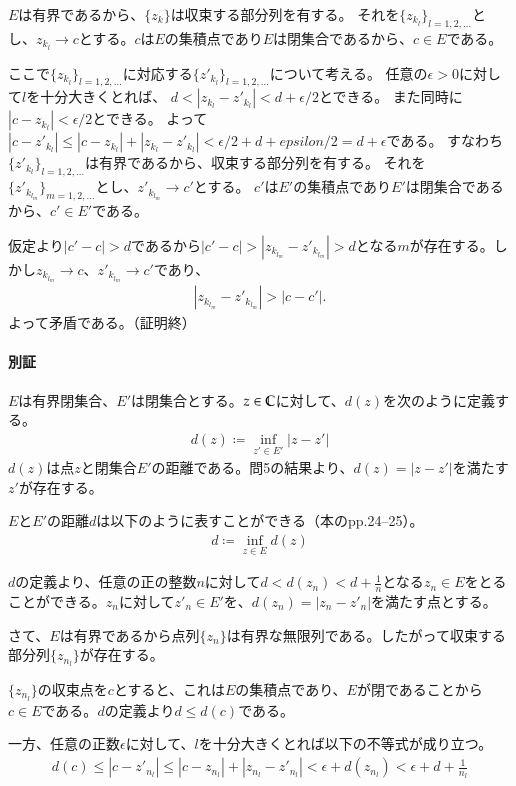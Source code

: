 $E$は有界であるから、$\{z_k\}$は収束する部分列を有する。
それを$\{z_{k_l}\}_{l=1,2,\dots}$とし、$z_{k_l}\longrightarrow c$とする。$c$は$E$の集積点であり$E$は閉集合であるから、$c\in E$である。

ここで$\{z_{k_l}\}_{l=1,2,\dots}$に対応する$\{z'_{k_l}\}_{l=1,2,\dots}$について考える。
任意の$\epsilon>0$に対して$l$を十分大きくとれば、
$d<|z_{k_l}-z'_{k_l}|<d+\epsilon/2$とできる。
また同時に$|c-z_{k_l}|<\epsilon/2$とできる。
よって$|c-z'_{k_l}|\le|c-z_{k_l}|+|z_{k_l}-z'_{k_l}|<\epsilon/2+d+epsilon/2=d+\epsilon$である。
すなわち$\{z'_{k_l}\}_{l=1,2,\dots}$は有界であるから、収束する部分列を有する。
それを$\{z'_{k_{l_m}}\}_{m=1,2,\dots}$とし、$z'_{k_{l_m}}\rightarrow c'$とする。
$c'$は$E'$の集積点であり$E'$は閉集合であるから、$c'\in E'$である。

仮定より$|c'-c|>d$であるから$|c'-c|>|z_{k_{l_m}}-z'_{k_{l_m}}|>d$となる$m$が存在する。しかし$z_{k_{l_m}}\longrightarrow c$、$z'_{k_{l_m}}\longrightarrow c'$であり、
\begin{align*}
    |z_{k_{l_m}}-z'_{k_{l_m}}|>|c-c'|.
\end{align*}
よって矛盾である。（証明終）

\paragraph{別証}
$E$は有界閉集合、$E'$は閉集合とする。$z\in \mathbb{C}$に対して、$d(z)$を次のように定義する。
\begin{align*}
    d(z)\coloneqq \inf_{z'\in E'}|z-z'|
\end{align*}
$d(z)$は点$z$と閉集合$E'$の距離である。問5の結果より、$d(z)=|z-z'|$を満たす$z'$が存在する。

$E$と$E'$の距離$d$は以下のように表すことができる（本のpp.24--25）。
\begin{align*}
    d\coloneqq \inf_{z\in E}d(z)
\end{align*}

$d$の定義より、任意の正の整数$n$に対して$d<d(z_n)<d+\frac{1}{n}$となる$z_n\in E$をとることができる。$z_n$に対して$z'_n\in E'$を、$d(z_n)=|z_n-z'_n|$を満たす点とする。

さて、$E$は有界であるから点列$\{z_n\}$は有界な無限列である。したがって収束する部分列$\{z_{n_l}\}$が存在する。

$\{z_{n_l}\}$の収束点を$c$とすると、これは$E$の集積点であり、$E$が閉であることから$c\in E$である。$d$の定義より$d\le d(c)$である。

一方、任意の正数$\epsilon$に対して、$l$を十分大きくとれば以下の不等式が成り立つ。
\begin{align*}
    d(c)\le|c-z'_{n_l}|\le|c-z_{n_l}|+|z_{n_l}-z'_{n_l}|<\epsilon+d(z_{n_l})<\epsilon+d+\frac{1}{n_l}
\end{align*}

